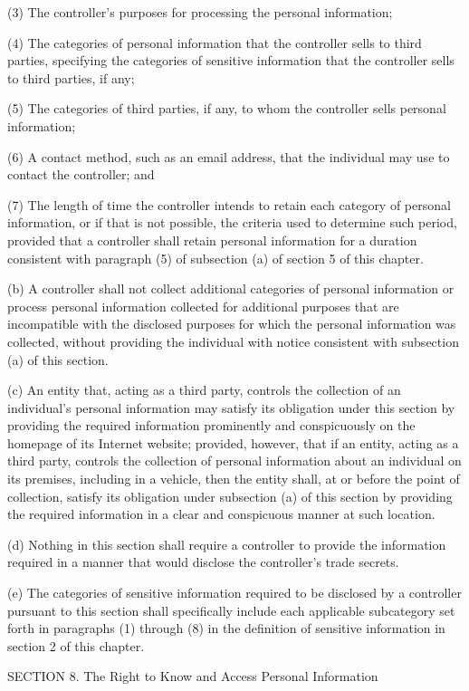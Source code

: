 (3) The controller’s purposes for processing the personal information;

(4) The categories of personal information that the controller sells to third parties, specifying the categories of sensitive information that the controller sells to third parties, if any; 

(5) The categories of third parties, if any, to whom the controller sells personal information;

(6) A contact method, such as an email address, that the individual may use to contact the controller; and

(7) The length of time the controller intends to retain each category of personal information, or if that is not possible, the criteria used to determine such period, provided that a controller shall retain personal information for a duration consistent with paragraph (5) of subsection (a) of section 5 of this chapter.

(b) A controller shall not collect additional categories of personal information or process personal information collected for additional purposes that are incompatible with the disclosed purposes for which the personal information was collected, without providing the individual with notice consistent with subsection (a) of this section. 

(c) An entity that, acting as a third party, controls the collection of an individual’s personal information may satisfy its obligation under this section by providing the required information prominently and conspicuously on the homepage of its Internet website; provided, however, that if an entity, acting as a third party, controls the collection of personal information about an individual on its premises, including in a vehicle, then the entity shall, at or before the point of collection, satisfy its obligation under subsection (a) of this section by providing the required information in a clear and conspicuous manner at such location.

(d) Nothing in this section shall require a controller to provide the information required in a manner that would disclose the controller’s trade secrets.

(e) The categories of sensitive information required to be disclosed by a controller pursuant to this section shall specifically include each applicable subcategory set forth in paragraphs (1) through (8) in the definition of sensitive information in section 2 of this chapter.

SECTION 8. The Right to Know and Access Personal Information  

